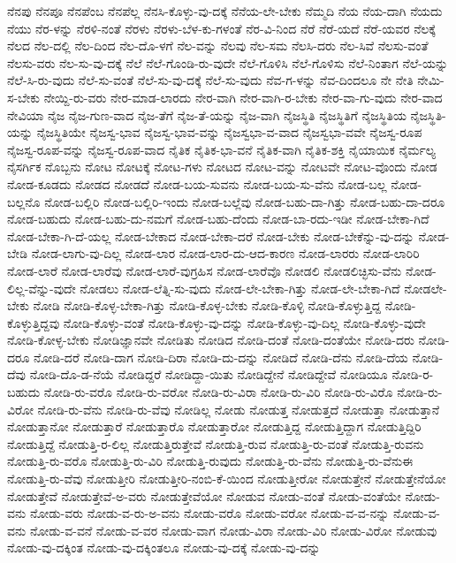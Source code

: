 {ನೆನಪು
ನೆನಪೂ
ನೆನಪೆಂಬ
ನೆನಪೆಲ್ಲ
ನೆನಸಿ-ಕೊಳ್ಳು-ವು-ದಕ್ಕೆ
ನೆನೆಯ-ಲೇ-ಬೇಕು
ನೆಮ್ಮದಿ
ನೆಯ
ನೆಯ-ದಾಗಿ
ನೆಯದು
ನೆಯು
ನೆರ-ಳನ್ನು
ನೆರಳಿ-ನಂತೆ
ನೆರಳು
ನೆರಳು-ಬೆಳ-ಕು-ಗಳಂತೆ
ನೆರ-ವಿ-ನಿಂದ
ನೆರೆ
ನೆರೆ-ಯದೆ
ನೆರೆ-ಯವರ
ನೆಲಕ್ಕೆ
ನೆಲದ
ನೆಲ-ದಲ್ಲಿ
ನೆಲ-ದಿಂದ
ನೆಲ-ದೊ-ಳಗೆ
ನೆಲ-ವನ್ನು
ನೆಲವು
ನೆಲ-ಸಮ
ನೆಲಸಿ-ದರು
ನೆಲ-ಸಿವೆ
ನೆಲಸು-ವಂತೆ
ನೆಲಸು-ವರು
ನೆಲ-ಸು-ವು-ದಕ್ಕೆ
ನೆಲೆ
ನೆಲೆ-ಗೊಂಡಿ-ರು-ವುದೇ
ನೆಲೆ-ಗೊಳಿಸಿ
ನೆಲೆ-ಗೊಳಿಸು
ನೆಲೆ-ನಿಂತಾಗ
ನೆಲೆ-ಯನ್ನು
ನೆಲೆ-ಸಿ-ರು-ವುದು
ನೆಲೆ-ಸು-ವಂತೆ
ನೆಲೆ-ಸು-ವು-ದಕ್ಕೆ
ನೆಲೆ-ಸು-ವುದು
ನೆವ-ಗ-ಳನ್ನು
ನೆವ-ದಿಂದಲೂ
ನೇ
ನೇತಿ
ನೇಮಿ-ಸ-ಬೇಕು
ನೇಯ್ದಿ-ರು-ವರು
ನೇರ-ಮಾಡ-ಲಾರದು
ನೇರ-ವಾಗಿ
ನೇರ-ವಾಗಿ-ರ-ಬೇಕು
ನೇರ-ವಾ-ಗು-ವುದು
ನೇರ-ವಾದ
ನೇವಿಯಾ
ನೈಜ
ನೈಜ-ಗುಣ-ವಾದ
ನೈಜ-ತೆಗೆ
ನೈಜ-ತೆ-ಯನ್ನು
ನೈಜ-ವಾಗಿ
ನೈಜಸ್ಥಿತಿ
ನೈಜಸ್ಥಿತಿಗೆ
ನೈಜಸ್ಥಿತಿಯ
ನೈಜಸ್ಥಿತಿ-ಯನ್ನು
ನೈಜಸ್ಥಿತಿಯೇ
ನೈಜಸ್ವ-ಭಾವ
ನೈಜಸ್ವ-ಭಾವ-ವನ್ನು
ನೈಜಸ್ವಭಾ-ವ-ವಾದ
ನೈಜಸ್ವಭಾ-ವವೇ
ನೈಜಸ್ವ-ರೂಪ
ನೈಜಸ್ವ-ರೂಪ-ವನ್ನು
ನೈಜಸ್ವ-ರೂಪ-ವಾದ
ನೈತಿಕ
ನೈತಿಕ-ಭಾ-ವನೆ
ನೈತಿಕ-ವಾಗಿ
ನೈತಿಕ-ಶಕ್ತಿ
ನೈಯಾಯಿಕ
ನೈರ್ಮಲ್ಯ
ನೈಸರ್ಗಿಕ
ನೊಬ್ಬನು
ನೋಟ
ನೋಟಕ್ಕೆ
ನೋಟ-ಗಳು
ನೋಟದ
ನೋಟ-ವನ್ನು
ನೋಟವೇ
ನೋಟ-ವೊಂದು
ನೋಡ
ನೋಡ-ಕೂಡದು
ನೋಡದ
ನೋಡದೆ
ನೋಡ-ಬಯ-ಸುವನು
ನೋಡ-ಬಯ-ಸು-ವೆನು
ನೋಡ-ಬಲ್ಲ
ನೋಡ-ಬಲ್ಲನೊ
ನೋಡ-ಬಲ್ಲಿರಿ
ನೋಡ-ಬಲ್ಲಿರಿ-ಇಂದು
ನೋಡ-ಬಲ್ಲೆವು
ನೋಡ-ಬಹು-ದಾ-ಗಿತ್ತು
ನೋಡ-ಬಹು-ದಾ-ದರೂ
ನೋಡ-ಬಹುದು
ನೋಡ-ಬಹು-ದು-ನಮಗೆ
ನೋಡ-ಬಹು-ದೆಂದು
ನೋಡ-ಬಾ-ರದು-ಇಡೀ
ನೋಡ-ಬೇಕಾ-ಗಿದೆ
ನೋಡ-ಬೇಕಾ-ಗಿ-ದೆ-ಯಲ್ಲ
ನೋಡ-ಬೇಕಾದ
ನೋಡ-ಬೇಕಾ-ದರೆ
ನೋಡ-ಬೇಕು
ನೋಡ-ಬೇಕೆನ್ನು-ವು-ದನ್ನು
ನೋಡ-ಬೇಡಿ
ನೋಡ-ಲಾಗು-ವು-ದಿಲ್ಲ
ನೋಡ-ಲಾರ
ನೋಡ-ಲಾರ-ದು-ಆದ-ಕಾರಣ
ನೋಡ-ಲಾರರು
ನೋಡ-ಲಾರಿರಿ
ನೋಡ-ಲಾರೆ
ನೋಡ-ಲಾರೆವು
ನೋಡ-ಲಾರೆ-ವುಗ್ರಹಿಸ
ನೋಡ-ಲಾರೆವೊ
ನೋಡಲಿ
ನೋಡಲಿಚ್ಛಿಸು-ವೆನು
ನೋಡ-ಲಿಲ್ಲ-ವೆನ್ನು-ವುದೇ
ನೋಡಲು
ನೋಡ-ಲೆತ್ನಿ-ಸು-ವುದು
ನೋಡ-ಲೇ-ಬೇಕಾ-ಗಿತ್ತು
ನೋಡ-ಲೇ-ಬೇಕಾ-ಗಿದೆ
ನೋಡಲೇ-ಬೇಕು
ನೋಡಿ
ನೋಡಿ-ಕೊಳ್ಳ-ಬೇಕಾ-ಗಿತ್ತು
ನೋಡಿ-ಕೊಳ್ಳ-ಬೇಕು
ನೋಡಿ-ಕೊಳ್ಳಿ
ನೋಡಿ-ಕೊಳ್ಳುತ್ತಿದ್ದ
ನೋಡಿ-ಕೊಳ್ಳುತ್ತಿದ್ದವು
ನೋಡಿ-ಕೊಳ್ಳು-ವಂತೆ
ನೋಡಿ-ಕೊಳ್ಳು-ವು-ದನ್ನು
ನೋಡಿ-ಕೊಳ್ಳು-ವು-ದಿಲ್ಲ
ನೋಡಿ-ಕೊಳ್ಳು-ವುದೇ
ನೋಡಿ-ಕೋಳ್ಳ-ಬೇಕು
ನೋಡಿಜ್ಞಾನವೇ
ನೋಡಿತು
ನೋಡಿದ
ನೋಡಿ-ದಂತೆ
ನೋಡಿ-ದಂತೆಯೇ
ನೋಡಿ-ದರು
ನೋಡಿ-ದರೂ
ನೋಡಿ-ದರೆ
ನೋಡಿ-ದಾಗ
ನೋಡಿ-ದಿರಾ
ನೋಡಿ-ದು-ದನ್ನು
ನೋಡಿದೆ
ನೋಡಿ-ದೆನು
ನೋಡಿ-ದೆಯ
ನೋಡಿ-ದೆವು
ನೋಡಿ-ದೊ-ಡ-ನೆಯೆ
ನೋಡಿದ್ದರೆ
ನೋಡಿದ್ದಾ-ಯಿತು
ನೋಡಿದ್ದೇನೆ
ನೋಡಿದ್ದೇವೆ
ನೋಡಿಯೂ
ನೋಡಿ-ರ-ಬಹುದು
ನೋಡಿ-ರು-ವರೊ
ನೋಡಿ-ರು-ವರೋ
ನೋಡಿ-ರು-ವಿರಾ
ನೋಡಿ-ರು-ವಿರಿ
ನೋಡಿ-ರು-ವಿರೊ
ನೋಡಿ-ರು-ವಿರೋ
ನೋಡಿ-ರು-ವೆನು
ನೋಡಿ-ರು-ವೆವು
ನೋಡಿಲ್ಲ
ನೋಡು
ನೋಡುತ್ತ
ನೋಡುತ್ತದೆ
ನೋಡುತ್ತಾ
ನೋಡುತ್ತಾನೆ
ನೋಡುತ್ತಾನೋ
ನೋಡುತ್ತಾರೆ
ನೋಡುತ್ತಾರೊ
ನೋಡುತ್ತಾರೋ
ನೋಡುತ್ತಿದ್ದ
ನೋಡುತ್ತಿದ್ದಾಗ
ನೋಡುತ್ತಿದ್ದಿರಿ
ನೋಡುತ್ತಿದ್ದೆ
ನೋಡುತ್ತಿ-ರ-ಲಿಲ್ಲ
ನೋಡುತ್ತಿರುತ್ತೇವೆ
ನೋಡುತ್ತಿ-ರುವ
ನೋಡುತ್ತಿ-ರು-ವಂತೆ
ನೋಡುತ್ತಿ-ರುವನು
ನೋಡುತ್ತಿ-ರು-ವರೊ
ನೋಡುತ್ತಿ-ರು-ವಿರಿ
ನೋಡುತ್ತಿ-ರುವುದು
ನೋಡುತ್ತಿ-ರು-ವೆನು
ನೋಡುತ್ತಿ-ರು-ವೆನುಈ
ನೋಡುತ್ತಿ-ರು-ವೆವು
ನೋಡುತ್ತೀರಿ
ನೋಡುತ್ತೀರಿ-ನಂಬಿ-ಕೆ-ಯಿಂದ
ನೋಡುತ್ತೀರೋ
ನೋಡುತ್ತೇನೆ
ನೋಡುತ್ತೇನೆಯೋ
ನೋಡುತ್ತೇವೆ
ನೋಡುತ್ತೇವೆ-ಅ-ವರು
ನೋಡುತ್ತೇವೆಯೋ
ನೋಡುವ
ನೋಡು-ವಂತೆ
ನೋಡು-ವಂತೆಯೇ
ನೋಡು-ವನು
ನೋಡು-ವರು
ನೋಡು-ವ-ರು-ಅ-ವನು
ನೋಡು-ವರೊ
ನೋಡು-ವರೋ
ನೋಡು-ವ-ವ-ನನ್ನು
ನೋಡು-ವ-ವನು
ನೋಡು-ವ-ವನೆ
ನೋಡು-ವ-ವರ
ನೋಡು-ವಾಗ
ನೋಡು-ವಿರಾ
ನೋಡು-ವಿರಿ
ನೋಡು-ವಿರೋ
ನೋಡುವು
ನೋಡು-ವು-ದಕ್ಕಿಂತ
ನೋಡು-ವು-ದಕ್ಕಿಂತಲೂ
ನೋಡು-ವು-ದಕ್ಕೆ
ನೋಡು-ವು-ದನ್ನು
}
